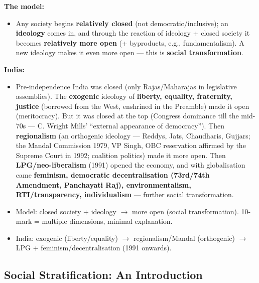 \begin{KeyConcept}
\textbf{The model:}
\begin{itemize}
\item Any society begins \textbf{relatively closed} (not democratic/inclusive); an \textbf{ideology} comes in, and through the reaction of ideology + closed society it becomes \textbf{relatively more open} (+ byproducts, e.g., fundamentalism). A new ideology makes it even more open --- this is \textbf{social transformation}.
\end{itemize}
\end{KeyConcept}

\begin{ExampleBox}
\textbf{India:}
\begin{itemize}
\item Pre-independence India was closed (only Rajas/Maharajas in legislative assemblies). The \textbf{exogenic} ideology of \textbf{liberty, equality, fraternity, justice} (borrowed from the West, enshrined in the Preamble) made it open (meritocracy). But it was closed at the top (Congress dominance till the mid-70s --- C. Wright Mills' ``external appearance of democracy''). Then \textbf{regionalism} (an orthogenic ideology --- Reddys, Jats, Chaudharis, Gujjars; the Mandal Commission 1979, VP Singh, OBC reservation affirmed by the Supreme Court in 1992; coalition politics) made it more open. Then \textbf{LPG/neo-liberalism} (1991) opened the economy, and with globalisation came \textbf{feminism, democratic decentralisation (73rd/74th Amendment, Panchayati Raj), environmentalism, RTI/transparency, individualism} --- further social transformation.
\end{itemize}
\end{ExampleBox}

\begin{QuickRevision}
\begin{itemize}
\item Model: closed society + ideology $\rightarrow$ more open (social transformation). 10-mark = multiple dimensions, minimal explanation.
\item India: exogenic (liberty/equality) $\rightarrow$ regionalism/Mandal (orthogenic) $\rightarrow$ LPG + feminism/decentralisation (1991 onwards).
\end{itemize}
\end{QuickRevision}

\sectiondivider

\subsection{Social Stratification: An Introduction}

